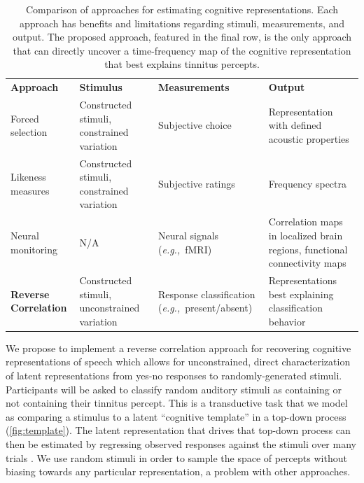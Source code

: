 \documentclass[11pt, notitlepage]{article} %
\newcommand{\myfloatalign}{\centering} %
\def\eg{{\emph{e.g.,}}~}
\begin{document}
\begin{table}[h]
	\myfloatalign
	\begin{tabularx}{\textwidth}{>{\raggedright}p{35mm} >{\raggedright\arraybackslash}p{40mm} >{\raggedright\arraybackslash}p{45mm} >{\raggedright\arraybackslash}p{50mm}}
		\toprule
		\textbf{Approach} & \textbf{Stimulus} & \textbf{Measurements} & \textbf{Output} \\ [0.5ex] 
		\rowcolor{Gray} Forced selection & Constructed stimuli, constrained variation & Subjective choice & Representation with \newline defined acoustic properties \\
		Likeness measures & Constructed stimuli, constrained variation & Subjective ratings & Frequency spectra \\
		\rowcolor{Gray} Neural monitoring & N/A & Neural signals (\eg fMRI) & Correlation maps in localized brain regions, functional connectivity maps \\
		\textbf{Reverse Correlation} & Constructed stimuli, unconstrained variation & Response classification (\eg present/absent) & Representations best explaining classification behavior \\
		\bottomrule
	\end{tabularx}
	\caption[Approaches]{Comparison of approaches for estimating cognitive representations.
	Each approach has benefits and limitations regarding stimuli, measurements, and output.
	The proposed approach, featured in the final row, is the only approach that can directly
	uncover a time-frequency map of the cognitive representation that best explains tinnitus percepts.}
	\label{tab:approaches}
\end{table}

We propose to implement a reverse correlation
approach for recovering cognitive representations of speech which allows for unconstrained, direct
characterization of latent representations from yes-no responses to randomly-generated stimuli.
Participants will be asked to classify random auditory stimuli as containing or not containing their tinnitus percept.
This is a transductive task that we model as comparing a stimulus to a latent ``cognitive template'' in a top-down process
(\autoref{fig:template}).
The latent representation that drives that top-down process
can then be estimated by regressing observed responses against the stimuli over many trials \cite{mineaultImprovedClassificationImages2009}.
We use random stimuli in order to sample the space of percepts without biasing towards any particular representation, a problem with other approaches.
\end{document}

